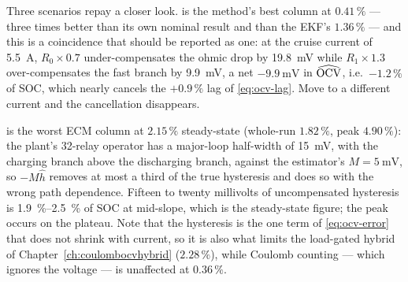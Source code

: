 Three scenarios repay a closer look.  is the method's best column at
$0.41\,\%$ --- three times better than its own nominal result and than the EKF's $1.36\,\%$ --- and
this is a coincidence that should be reported as one: at the cruise current of \SI{5.5}{\ampere},
$R_0\times0.7$ under-compensates the ohmic drop by \SI{19.8}{\milli\volt} while $R_1\times1.3$
over-compensates the fast branch by \SI{9.9}{\milli\volt}, a net $-\SI{9.9}{\milli\volt}$ in
$\widehat{\mathrm{OCV}}$, i.e.\ $-1.2\,\%$ of SOC, which nearly cancels the $+0.9\,\%$ lag of
\eqref{eq:ocv-lag}. Move to a different current and the cancellation disappears.

 is the worst ECM column at $2.15\,\%$ steady-state (whole-run $1.82\,\%$, peak
$4.90\,\%$): the plant's 32-relay operator has a major-loop half-width of \SI{15}{\milli\volt}, with
the charging branch above the discharging branch, against the estimator's $M=\SI{5}{\milli\volt}$,
so $-M\hat h$ removes at most a third of the true hysteresis and does so with the wrong path
dependence. Fifteen to twenty millivolts of uncompensated hysteresis is
\SIrange{1.9}{2.5}{\percent} of SOC at mid-slope, which is the steady-state figure; the peak occurs
on the plateau. Note that the hysteresis is the one term of \eqref{eq:ocv-error} that does not
shrink with current, so it is also what limits the load-gated hybrid of
Chapter~\ref{ch:coulombocvhybrid} ($2.28\,\%$), while Coulomb counting --- which ignores the voltage
--- is unaffected at $0.36\,\%$.

